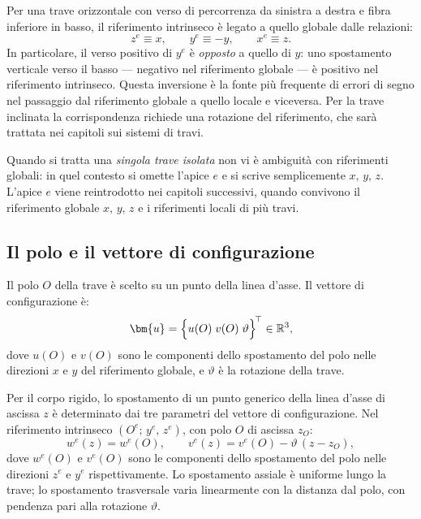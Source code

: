 \begin{oss}
	Per una trave orizzontale con verso di percorrenza
	da sinistra a destra e fibra inferiore in basso,
	il riferimento intrinseco è legato a quello globale
	dalle relazioni:
	\begin{equation}
		z^e \equiv x, \qquad
		y^e \equiv -y, \qquad
		x^e \equiv z.
	\end{equation}
	In particolare, il verso positivo di $y^e$ è
	\emph{opposto} a quello di $y$: uno spostamento
	verticale verso il basso --- negativo nel
	riferimento globale --- è positivo nel riferimento
	intrinseco. Questa inversione è la fonte più
	frequente di errori di segno nel passaggio dal
	riferimento globale a quello locale e viceversa.
	Per la trave inclinata la corrispondenza richiede
	una rotazione del riferimento, che sarà trattata
	nei capitoli sui sistemi di travi.
\end{oss}

\begin{oss}
	Quando si tratta una \emph{singola trave isolata}
	non vi è ambiguità con riferimenti globali: in
	quel contesto si omette l'apice $e$ e si scrive
	semplicemente $x,\,y, \,z$. L'apice $e$ viene
	reintrodotto nei capitoli successivi, quando
	convivono il riferimento globale $x,\,y, \,z$ e
	i riferimenti locali di più travi.
\end{oss}

\subsection{Il polo e il vettore di configurazione}
\label{sec:polo_trave}

Il polo $O$ della trave è scelto su un punto della
linea d'asse. Il vettore di configurazione è:
\begin{equation}\label{eq:conf_trave}
	\bm{u} =
	\Bigl\{u (O)\; v(O) \; \vartheta\Bigr\}^{\!\top}
	\in \mathbb{R}^3,
\end{equation}
dove $u(O)$ e $v(O)$ sono le componenti dello spostamento
del polo nelle direzioni $x$ e $y$ del riferimento
globale, e $\vartheta$ è la rotazione della trave.


Per il corpo rigido, lo spostamento di un punto
generico della linea d'asse di ascissa $z$ è
determinato dai tre parametri del vettore di
configurazione. Nel riferimento intrinseco
$(O^e;\, y^e,\, z^e)$, con polo $O$ di ascissa $z_O$:
\begin{equation}\label{eq:cinematica_trave}
	w^e(z) = w^e(O),
	\qquad
	v^e(z) = v^e(O) - \vartheta\,(z - z_O),
\end{equation}
dove $w^e(O)$ e $v^e(O)$ sono le componenti dello
spostamento del polo nelle direzioni $z^e$ e $y^e$
rispettivamente. Lo spostamento assiale è uniforme
lungo la trave; lo spostamento trasversale varia
linearmente con la distanza dal polo, con pendenza
pari alla rotazione $\vartheta$.

